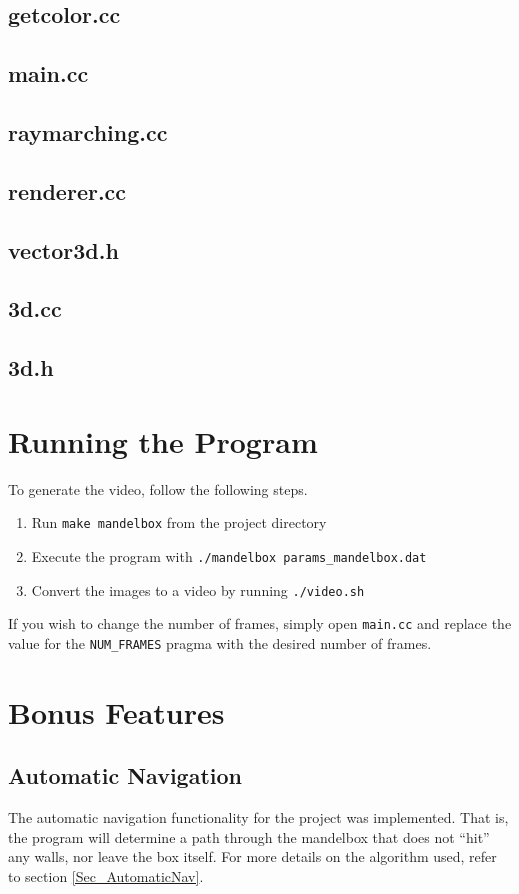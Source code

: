 \documentclass[11pt]{article}
\begin{document}
\subsection{getcolor.cc}


\subsection{main.cc}


\subsection{raymarching.cc}


\subsection{renderer.cc}


\subsection{vector3d.h}


\subsection{3d.cc}


\subsection{3d.h}


\section{Running the Program}
To generate the video, follow the following steps.
\begin{enumerate}
\item Run \texttt{make mandelbox} from the project directory
\item Execute the program with \texttt{./mandelbox params\_mandelbox.dat}
\item Convert the images to a video by running \texttt{./video.sh}
\end{enumerate}

If you wish to change the number of frames, simply open \texttt{main.cc} and replace the value for the \texttt{NUM\_FRAMES} pragma with the desired number of frames.

\section{Bonus Features}
\subsection{Automatic Navigation}
The automatic navigation functionality for the project was implemented. That is, the program will determine a path through the mandelbox that does not ``hit'' any walls, nor leave the box itself. For more details on the algorithm used, refer to section \ref{Sec_AutomaticNav}.
\end{document}
